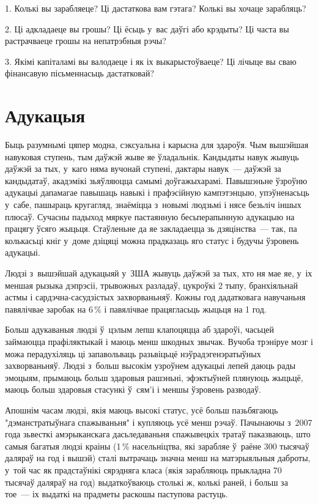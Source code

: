 1. Колькі вы зарабляеце? Ці дастаткова вам гэтага? Колькі вы хочаце зарабляць?

2. Ці адкладаеце вы грошы? Ці ёсьць у~вас даўгі або крэдыты? Ці часта вы растрачваеце грошы на непатрэбныя рэчы?

3. Якімі капіталамі вы валодаеце і як іх выкарыстоўваеце? Ці лічыце вы сваю фінансавую пісьменнасьць дастатковай?


\section{Адукацыя}

Быць разумнымі цяпер модна, сэксуальна і карысна для здароўя. Чым вышэйшая навуковая ступень, тым даўжэй жыве яе ўладальнік. Кандыдаты навук жывуць даўжэй за тых, у~каго няма вучонай ступені, дактары навук~--- даўжэй за кандыдатаў, акадэмікі зьяўляюцца самымі доўгажыхарамі. Павышэньне ўзроўню адукацыі дапамагае павышаць навыкі і прафэсійную кампэтэнцыю, упэўненасьць у~сабе, пашыраць кругагляд, знаёміцца з~новымі людзьмі і нясе безьліч іншых плюсаў. Сучасны падыход мяркуе пастаянную бесьперапынную адукацыю на працягу ўсяго жыцьця. Стаўленьне да яе закладаецца зь дзяцінства~--- так, па колькасьці кніг у~доме дзіцяці можна прадказаць яго статус і будучы ўзровень адукацыі.

Людзі з~вышэйшай адукацыяй у~ЗША жывуць даўжэй за тых, хто ня мае яе, у~іх меншая рызыка дэпрэсіі, трывожных разладаў, цукроўкі 2 тыпу, бранхіяльнай астмы і сардэчна-сасудзістых захворваньняў. Кожны год дадатковага навучаньня павялічвае заробак на 6\,\% і павялічвае працягласьць жыцьця на 1 год.

Больш адукаваныя людзі ў~цэлым лепш клапоцяцца аб здароўі, часьцей займаюцца прафіляктыкай і маюць менш шкодных звычак. Вучоба трэніруе мозг і можа перадухіляць ці запавольваць разьвіцьцё нэўрадэгенэратыўных захворваньняў. Людзі з~больш высокім узроўнем адукацыі лепей даюць рады эмоцыям, прымаюць больш здаровыя рашэньні, эфэктыўней плянуюць жыцьцё, маюць больш здаровыя стасункі ў~сям'і і меншы ўзровень разводаў.

Апошнім часам людзі, якія маюць высокі статус, усё больш пазьбягаюць "дэманстратыўнага спажываньня" і купляюць усё менш рэчаў. Пачынаючы з~2007 года зьвесткі амэрыканскага дасьледаваньня спажывецкіх тратаў паказваюць, што самыя багатыя людзі краіны (1\,\% насельніцтва, які зарабляе ў~раёне 300 тысячаў даляраў на год і вышэй) сталі вытрачаць значна менш на матэрыяльныя даброты, у~той час як прадстаўнікі сярэдняга класа (якія зарабляюць прыкладна 70 тысячаў даляраў на год) выдаткоўваюць столькі ж, колькі раней, і больш за тое~--- іх выдаткі на прадметы раскошы паступова растуць.

